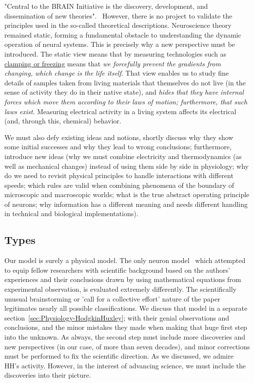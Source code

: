 "Central to the BRAIN Initiative is the discovery, development, and dissemination of new theories".~\cite{NIHBrainStrategy:2020} However, there is no project to validate 
the principles used in the so-called theoretical descriptions.
Neuroscience theory remained static, forming a fundamental obstacle to understanding the dynamic operation of neural systems.
%
This is precisely why a new perspective must be introduced. The static view
means that by measuring technologies such as \hyperlink{voltage-clamping}{clamping or freezing} means that 
\textit{we forcefully prevent the gradients from changing, which change is the 
life itself}. That view enables us to study fine details of samples taken from living materials that themselves do not live (in the sense of activity they do in their native state), and \textit{hides that they have internal forces which move them according to their laws of motion; furthermore, that such laws exist}. Measuring electrical activity in a living system affects its electrical (and, through this, chemical) behavior.


We must also defy existing ideas and notions, shortly discuss why they show some initial successes and why they lead to wrong conclusions; furthermore, introduce new ideas (why we must combine electricity and thermodynamics (as well as mechanical changes) instead of using them side by side in physiology; why do we need to revisit physical principles to handle interactions with different speeds; which rules are valid when combining phenomena of the boundary of microscopic and macroscopic worlds; what is the true abstract operating principle of neurons; why information has a different meaning and needs different handling in technical and biological implementations).

\subsection{Types\label{sec:SINGLE_ModelTypes}}

Our model is surely a physical model.
The only neuron model~\cite{HodgkinHuxley:1952} which attempted to equip 
fellow researchers with scientific
background based on the authors' experiences and their conclusions
drawn by using mathematical equations from experimental observation,
is evaluated extremely differently.
The scientifically unusual brainstorming or 'call for a collective effort' nature
of the paper legitimates nearly all possible classifications. 
We discuss that model in a separate section~\ref{sec:Physiology-HodgkinHuxley};
with their genial observations and conclusions, and the minor mistakes
they made when making that huge first step into the unknown. As always, the second step
must include more discoveries and new perspectives (in our case, of more than seven decades), and minor corrections must be performed to fix the scientific direction.
As we discussed, we admire \gls{HH}'s activity. However, 
in the interest of advancing science, we must include the discoveries
into their picture.

